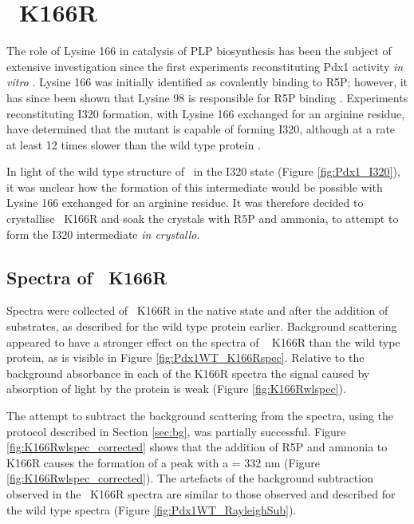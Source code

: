\section{\atpdx ~K166R}
The role of Lysine 166 in catalysis of PLP biosynthesis has been the subject of extensive investigation since the first experiments reconstituting Pdx1 activity \textit{in vitro} \cite{Burns2005}. Lysine 166 was initially identified as covalently binding to R5P; however, it has since been shown that Lysine 98 is responsible for R5P binding \cite{Raschle2007}. Experiments reconstituting I320 formation, with Lysine 166 exchanged for an arginine residue, have determined that the mutant is capable of forming I320, although at a rate at least 12 times slower than the wild type protein \cite{Raschle2007,Smith2015}.

In light of the wild type structure of \atpdx ~in the I320 state (Figure \ref{fig:Pdx1_I320}), it was unclear how the formation of this intermediate would be possible with Lysine 166 exchanged for an arginine residue. It was therefore decided to crystallise \atpdx ~K166R and soak the crystals with R5P and ammonia, to attempt to form the I320 intermediate \textit{in crystallo}.    

\subsection*{Spectra of \atpdx ~K166R}
Spectra were collected of \atpdx ~K166R in the native state and after the addition of substrates, as described for the wild type protein earlier. Background scattering appeared to have a stronger effect on the spectra of \atpdx~ K166R than the wild type protein, as is visible in Figure \ref{fig:Pdx1WT_K166Rspec}. Relative to the background absorbance in each of the K166R spectra the signal caused by absorption of light by the protein is weak (Figure \ref{fig:K166Rwlspec}).   

The attempt to subtract the background scattering from the spectra, using the protocol described in Section \ref{sec:bg}, was partially successful. Figure \ref{fig:K166Rwlspec_corrected} shows that the addition of R5P and ammonia to \atpdx~ K166R causes the formation of a peak with a \lwl = 332 nm (Figure \ref{fig:K166Rwlspec_corrected}). The artefacts of the background subtraction observed in the \atpdx ~K166R spectra are similar to those observed and described for the wild type spectra (Figure \ref{fig:Pdx1WT_RayleighSub}). %


